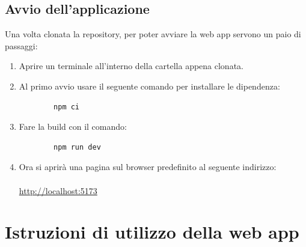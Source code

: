 \documentclass{article}
\begin{document}
\subsection{Avvio dell'applicazione}
Una volta clonata la repository, per poter avviare la web app servono un paio di passaggi:
\begin{enumerate}
    \item Aprire un terminale all'interno della cartella appena clonata.
    \item Al primo avvio usare il seguente comando per installare le dipendenza:
        \begin{lstlisting}
        npm ci
        \end{lstlisting}
    \item Fare la build con il comando:
        \begin{lstlisting}
        npm run dev
        \end{lstlisting}   
    \item Ora si aprirà una pagina sul browser predefinito al seguente indirizzo:\\\\
    \url{http://localhost:5173}
\end{enumerate}

\section{Istruzioni di utilizzo della web app}
\end{document}
